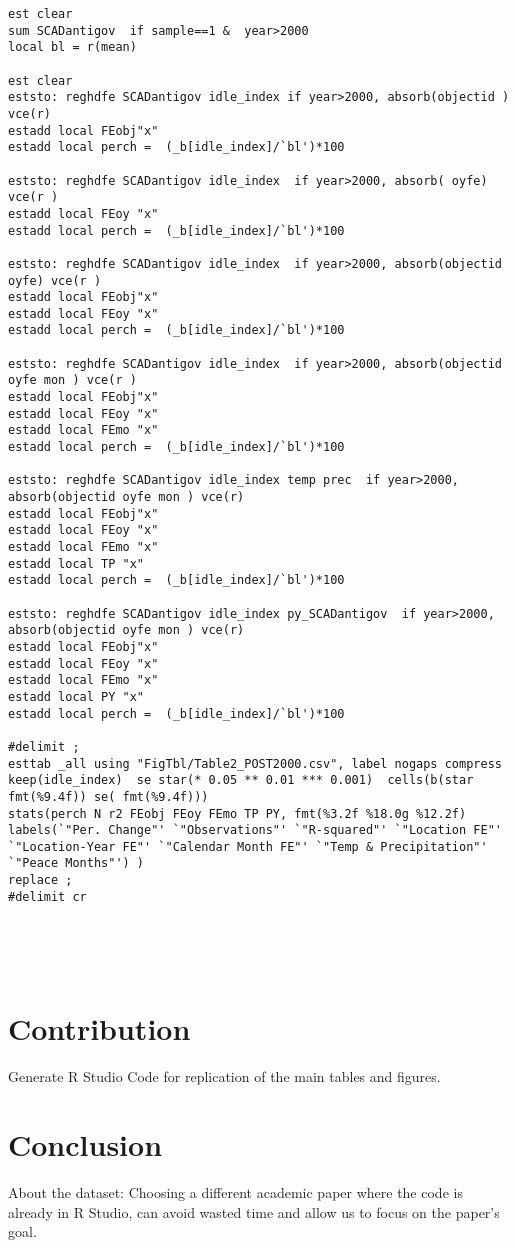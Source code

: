 \documentclass[12pt,letterpaper]{article}
\begin{document}
\begin{lstlisting}
est clear 
sum SCADantigov  if sample==1 &  year>2000
local bl = r(mean) 

est clear
eststo: reghdfe SCADantigov idle_index if year>2000, absorb(objectid ) vce(r)  
estadd local FEobj"x"
estadd local perch =  (_b[idle_index]/`bl')*100

eststo: reghdfe SCADantigov idle_index  if year>2000, absorb( oyfe) vce(r )  
estadd local FEoy "x"
estadd local perch =  (_b[idle_index]/`bl')*100

eststo: reghdfe SCADantigov idle_index  if year>2000, absorb(objectid oyfe) vce(r )  
estadd local FEobj"x"
estadd local FEoy "x"
estadd local perch =  (_b[idle_index]/`bl')*100

eststo: reghdfe SCADantigov idle_index  if year>2000, absorb(objectid oyfe mon ) vce(r )  
estadd local FEobj"x"
estadd local FEoy "x"
estadd local FEmo "x"
estadd local perch =  (_b[idle_index]/`bl')*100

eststo: reghdfe SCADantigov idle_index temp prec  if year>2000, absorb(objectid oyfe mon ) vce(r)  
estadd local FEobj"x"
estadd local FEoy "x"
estadd local FEmo "x"
estadd local TP "x"
estadd local perch =  (_b[idle_index]/`bl')*100

eststo: reghdfe SCADantigov idle_index py_SCADantigov  if year>2000, absorb(objectid oyfe mon ) vce(r)  
estadd local FEobj"x"
estadd local FEoy "x"
estadd local FEmo "x"
estadd local PY "x"
estadd local perch =  (_b[idle_index]/`bl')*100

#delimit ; 
esttab _all using "FigTbl/Table2_POST2000.csv", label nogaps compress 
keep(idle_index)  se star(* 0.05 ** 0.01 *** 0.001)  cells(b(star fmt(%9.4f)) se( fmt(%9.4f)))
stats(perch N r2 FEobj FEoy FEmo TP PY, fmt(%3.2f %18.0g %12.2f) labels(`"Per. Change"' `"Observations"' `"R-squared"' `"Location FE"' `"Location-Year FE"' `"Calendar Month FE"' `"Temp & Precipitation"' `"Peace Months"') )
replace ; 
#delimit cr 
\end{lstlisting}


\begin{verbatim}
	
	
	
\end{verbatim}


\section*{Contribution}

Generate R Studio Code for replication of the main tables and figures. 

\section*{Conclusion}
About the dataset: 
Choosing a different academic paper where the code is already in R Studio, can avoid wasted time and allow us to focus on the paper's goal.
\end{document}
